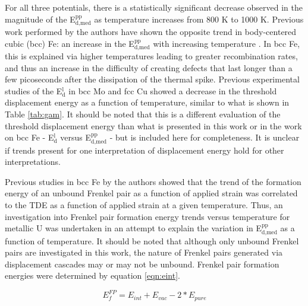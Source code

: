\documentclass[review]{elsarticle}
\begin{document}
\FloatBarrier

For all three potentials, there is a statistically significant decrease observed in the magnitude of the E$^{\textrm{pp}}_{\textrm{d,med}}$ as temperature increases from 800 K to 1000 K. Previous work performed by the authors have shown the opposite trend in body-centered cubic (bcc) Fe: an increase in the E$^{\textrm{pp}}_{\textrm{d,med}}$ with increasing temperature \cite{beeler2016}. In bcc Fe, this is explained via higher temperatures leading to greater recombination rates, and thus an increase in the difficulty of creating defects that last longer than a few picoseconds after the dissipation of the thermal spike. Previous experimental studies of the E$^{\textrm{l}}_{\textrm{d}}$ in bcc Mo \cite{zag1983} and fcc Cu\cite{yoshida1979} showed a decrease in the threshold displacement energy as a function of temperature, similar to what is shown in Table \ref{tab:gam}. It should be noted that this is a different evaluation of the threshold displacement energy than what is presented in this work or in the work on bcc Fe \cite{beeler2016}- E$^{\textrm{l}}_{\textrm{d}}$ versus E$^{\textrm{pp}}_{\textrm{d,med}}$ - but is included here for completeness. It is unclear if trends present for one interpretation of displacement energy hold for other interpretations. 

Previous studies in bcc Fe \cite{beeler2015, beeler2016} by the authors showed that the trend of the formation energy of an unbound Frenkel pair as a function of applied strain was correlated to the TDE as a function of applied strain at a given temperature. Thus, an investigation into Frenkel pair formation energy trends versus temperature for metallic U was undertaken in an attempt to explain the variation in E$^{\textrm{pp}}_{\textrm{d,med}}$ as a function of temperature. It should be noted that although only unbound Frenkel pairs are investigated in this work, the nature of Frenkel pairs generated via displacement cascades may or may not be unbound. Frenkel pair formation energies were determined by equation \ref{eqn:eint}.

\begin{equation}
\label{eqn:eint}
E_{f}^{FP} = E_{int} + E_{vac} - 2*E_{pure}
\end{equation} 
\end{document}
